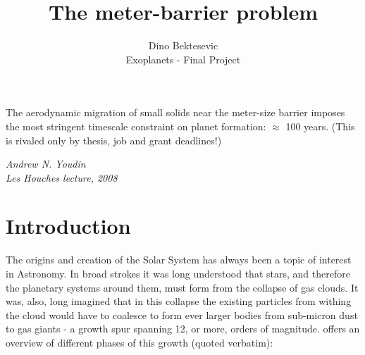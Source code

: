 \documentclass[12pt]{article}
\begin{document}
\title{The meter-barrier problem}
\author{Dino Bektesevic \\ 
Exoplanets - Final Project}
\maketitle


\epigraph{\centering The aerodynamic migration of small solids near the meter-size barrier imposes the most stringent timescale constraint on planet formation: $\approx$ 100 years. (This is rivaled only by thesis, job and grant deadlines!)}{\textit{Andrew N. Youdin \\ Les Houches lecture, 2008}}
\newpage

\section{Introduction}

The origins and creation of the Solar System has always been a topic of interest in Astronomy. In broad strokes it was long understood that stars, and therefore the planetary systems around them, must form from the collapse of gas clouds. It was, also, long imagined that in this collapse the existing particles from withing the cloud would have to coalesce to form ever larger bodies from sub-micron dust to gas giants - a growth spur spanning 12, or more, orders of magnitude. \citet{Armitage07} offers an overview of different phases of this growth (quoted verbatim):
\end{document}
